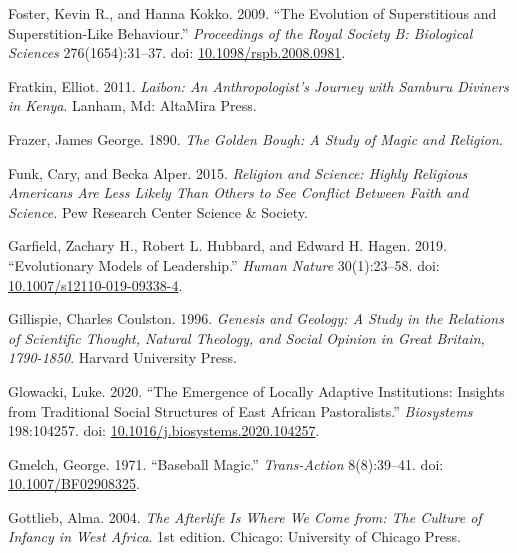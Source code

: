 \documentclass[
  11pt,
]{article}
\begin{document}
\leavevmode\hypertarget{ref-fosterEvolutionSuperstitiousSuperstitionlike2009}{}%
Foster, Kevin R., and Hanna Kokko. 2009. ``The Evolution of Superstitious and Superstition-Like Behaviour.'' \emph{Proceedings of the Royal Society B: Biological Sciences} 276(1654):31--37. doi: \href{https://doi.org/10.1098/rspb.2008.0981}{10.1098/rspb.2008.0981}.

\leavevmode\hypertarget{ref-fratkinLaibonAnthropologistJourney2011}{}%
Fratkin, Elliot. 2011. \emph{Laibon: An Anthropologist's Journey with Samburu Diviners in Kenya}. Lanham, Md: AltaMira Press.

\leavevmode\hypertarget{ref-frazerGoldenBoughStudy2003}{}%
Frazer, James George. 1890. \emph{The Golden Bough: A Study of Magic and Religion}.

\leavevmode\hypertarget{ref-funkReligionScienceHighly2015}{}%
Funk, Cary, and Becka Alper. 2015. \emph{Religion and Science: Highly Religious Americans Are Less Likely Than Others to See Conflict Between Faith and Science.} Pew Research Center Science \& Society.

\leavevmode\hypertarget{ref-garfieldEvolutionaryModelsLeadership2019}{}%
Garfield, Zachary H., Robert L. Hubbard, and Edward H. Hagen. 2019. ``Evolutionary Models of Leadership.'' \emph{Human Nature} 30(1):23--58. doi: \href{https://doi.org/10.1007/s12110-019-09338-4}{10.1007/s12110-019-09338-4}.

\leavevmode\hypertarget{ref-gillispie1996genesis}{}%
Gillispie, Charles Coulston. 1996. \emph{Genesis and Geology: A Study in the Relations of Scientific Thought, Natural Theology, and Social Opinion in Great Britain, 1790-1850}. Harvard University Press.

\leavevmode\hypertarget{ref-glowackiEmergenceLocallyAdaptive2020}{}%
Glowacki, Luke. 2020. ``The Emergence of Locally Adaptive Institutions: Insights from Traditional Social Structures of East African Pastoralists.'' \emph{Biosystems} 198:104257. doi: \href{https://doi.org/10.1016/j.biosystems.2020.104257}{10.1016/j.biosystems.2020.104257}.

\leavevmode\hypertarget{ref-gmelchBaseballMagic1971}{}%
Gmelch, George. 1971. ``Baseball Magic.'' \emph{Trans-Action} 8(8):39--41. doi: \href{https://doi.org/10.1007/BF02908325}{10.1007/BF02908325}.

\leavevmode\hypertarget{ref-gottliebAfterlifeWhereWe2004}{}%
Gottlieb, Alma. 2004. \emph{The Afterlife Is Where We Come from: The Culture of Infancy in West Africa}. 1st edition. Chicago: University of Chicago Press.
\end{document}
